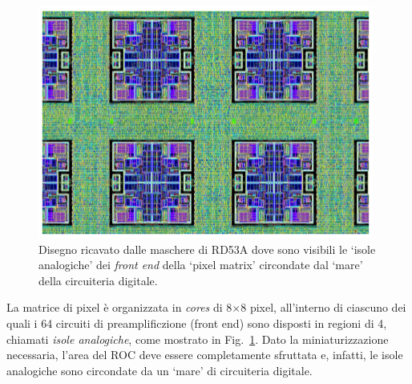 \begin{figure}
\centering
\includegraphics[scale=.5]{Immagini/AnalogIsland}
\caption{Disegno ricavato dalle maschere di RD53A dove sono visibili le `isole analogiche' dei \textit{front end} della `pixel matrix' circondate dal `mare' della circuiteria digitale.}
\label{AnalogIsland}
\end{figure} 
La matrice di pixel è organizzata in \textit{cores} di 8$\times$8 pixel, all'interno di ciascuno dei quali i 64 circuiti di preamplificzione (front end) sono disposti in regioni di 4, chiamati {\em isole analogiche}, come mostrato in Fig.~\ref{AnalogIsland}. 
Dato la miniaturizzazione necessaria, l'area del ROC deve essere completamente sfruttata e, infatti, le isole analogiche sono circondate da un `mare' di circuiteria digitale. 


